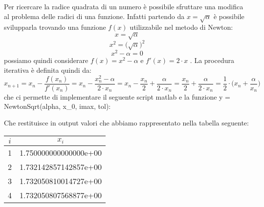 Per ricercare la radice quadrata di un numero è possibile sfruttare una modifica al problema delle radici di una funzione. Infatti partendo da $x=\sqrt{\alpha}$ è possibile svilupparla trovando una funzione $f(x)$ utilizzabile nel metodo di Newton:
\[
x = \sqrt{\alpha} 
\]
\[
x^{2} = \big(\sqrt{\alpha}\big)^{2} 
\]
\[
x^{2} - \alpha = 0
\]
possiamo quindi considerare $f(x) = x^{2} - \alpha$ e $f'(x) = 2\cdot x$ . La procedura iterativa è definita quindi da:
\[
x_{n+1} = x_{n} - \frac{f(x_{n})}{f'(x_{n})} = x_{n}-\frac{x_{n}^2-\alpha}{2\cdot x_{n}} = x_{n} - \frac{x_{n}}{2} + \frac{\alpha}{2\cdot x_{n}} = \frac{x_{n}}{2}+\frac{\alpha}{2\cdot x_{n}} = \frac{1}{2} \cdot \Big(x_{n}+\frac{\alpha}{x_{n}}\Big)
\]
che ci permette di implementare il seguente script matlab e la funzione y = NewtonSqrt(alpha, x\_0, imax, tol):


Che restituisce in output valori che abbiamo rappresentato nella tabella seguente:
\begin{center}
\begin{tabular}{|c|c|}
\hline
$i$ & \( x_i \) \\
\hline
1 & 1.750000000000000e+00 \\
2 & 1.732142857142857e+00 \\
3 & 1.732050810014727e+00 \\
4 & 1.732050807568877e+00 \\
\hline
\end{tabular}\\
\end{center}